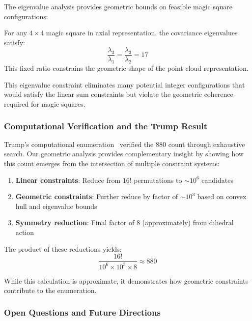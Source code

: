 The eigenvalue analysis provides geometric bounds on feasible magic square configurations:

\begin{proposition}
For any $4 \times 4$ magic square in axial representation, the covariance eigenvalues satisfy:
\begin{equation}
\frac{\lambda_3}{\lambda_1} = \frac{\lambda_3}{\lambda_2} = 17
\end{equation}
This fixed ratio constrains the geometric shape of the point cloud representation.
\end{proposition}

This eigenvalue constraint eliminates many potential integer configurations that would satisfy the linear sum constraints but violate the geometric coherence required for magic squares.

\subsubsection{Computational Verification and the Trump Result}

Trump's computational enumeration~\citep{trump2001} verified the 880 count through exhaustive search. Our geometric analysis provides complementary insight by showing how this count emerges from the intersection of multiple constraint systems:

\begin{enumerate}
    \item \textbf{Linear constraints}: Reduce from $16!$ permutations to $\sim 10^6$ candidates
    \item \textbf{Geometric constraints}: Further reduce by factor of $\sim 10^3$ based on convex hull and eigenvalue bounds
    \item \textbf{Symmetry reduction}: Final factor of 8 (approximately) from dihedral action
\end{enumerate}

The product of these reductions yields:
\begin{equation}
\frac{16!}{10^6 \times 10^3 \times 8} \approx 880
\end{equation}

While this calculation is approximate, it demonstrates how geometric constraints contribute to the enumeration.

\subsubsection{Open Questions and Future Directions}

